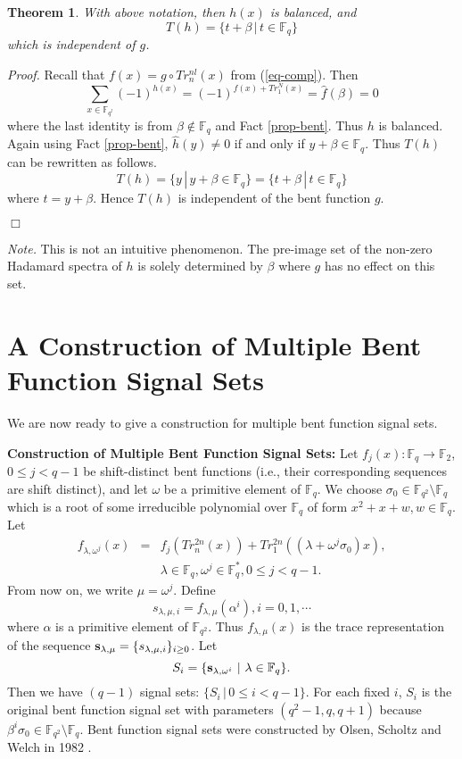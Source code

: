 \documentclass{article}
\newtheorem{theorem}{Theorem}
\newcommand{\F}{\ensuremath{\mathbb F}}
\newcommand{\done}{\hfill $\Box$ }
\newcommand{\sbu}{{\bf{s}}}
\begin{document}
\begin{theorem} \label{th1} With above notation,  then $h(x)$ is balanced, and 
\[
T(h)= \{t+\beta \,|\,t\in \F_q\}
\]
which is independent of  $g$. 
\end{theorem}
{\em Proof.}  Recall that  $f(x)=g\circ   Tr_n^{nl}(x)$ from (\ref{eq-comp}). Then
\[
\sum_{x\in \F_{q^l}} (-1)^{h(x)}=(-1)^{f(x)+Tr_1^N(x)}=\widehat{f}(\beta)=0
\]
where the last identity is from $\beta \notin \F_q$ and Fact \ref{prop-bent}. Thus $h$ is balanced. 
Again using Fact  \ref{prop-bent},  
$\widehat{h} (y)\ne 0$ if and only if $y+\beta \in \F_q$.   Thus $T(h)$ can be rewritten
as follows.
\[
T(h)=\{y \,|\,y+ \beta \in \F_q\}=\{t+\beta  \,|\,t\in \F_q\}
\]
where $t=y+\beta$.  Hence   $T(h)$ is independent of  the bent  function $g$.  

\done

{\em Note.} This is not an intuitive phenomenon.   The pre-image set of the non-zero Hadamard spectra  of $h$ is solely determined by $\beta$ where $g$ has no effect on this set.    


\section{ A Construction of Multiple Bent Function Signal Sets}

We are now ready to give a construction for multiple bent
function signal sets.

{\bf Construction of Multiple Bent Function Signal Sets: }
 Let $f_{j}(x):\F_{q} \rightarrow \F_2$, $0\le j<q-1$ be  shift-distinct 
bent functions (i.e., their corresponding sequences are shift distinct),   and let $\omega$ be a primitive element of $\F_q$. We choose
 $\sigma_0 \in \F_{q^2}\setminus \F_{q}$ which is a root of some
 irreducible polynomial over $\F_q$ of form $x^2+x+w, w\in \F_q$. 
Let  
 \begin{eqnarray}\label{eq-f}
 f_{\lambda,  \omega^j}(x)&= &f_{j} (Tr_n^{2n}(x))+Tr_1^{2n}((\lambda+\omega^j \sigma_0)x),\\
&& 
\lambda \in \F_{q}, \omega^j\in \F_q^*, 0\le j<q-1. \nonumber
\end{eqnarray}
 From now on, we write  $\mu=\omega^j$. Define 
\[
s_{\lambda, \mu, i}=f_{\lambda, \mu}(\alpha^i), i=0, 1, \cdots
\]
where $\alpha$ is a primitive element of $\F_{q^2}$. 
Thus $f_{\lambda, \mu}(x)$ is  the trace representation of the
sequence $\sbu_{\lambda, \mu}=\{s_{\lambda, \mu, i}\}_{i\ge 0}$.
Let
\[
S_{i} =\{\sbu_{\lambda, \omega^i}\,\, |\,\, \lambda \in \F_q \}.\]
Then we have $(q-1)$  signal sets: $\{S_{i}\,|\, 0\le i<q-1\}$. For each fixed $i$, $S_{i}$ is the original bent
function signal set with parameters
 $(q^2-1, q, q+1)$ because $\beta^i\sigma_0\in \F_{q^2} \setminus
 \F_q$.  Bent function signal sets were constructed by
  Olsen, Scholtz and Welch in 1982
  \cite{Osenz-Scholtl-Welch}.  
\end{document}
